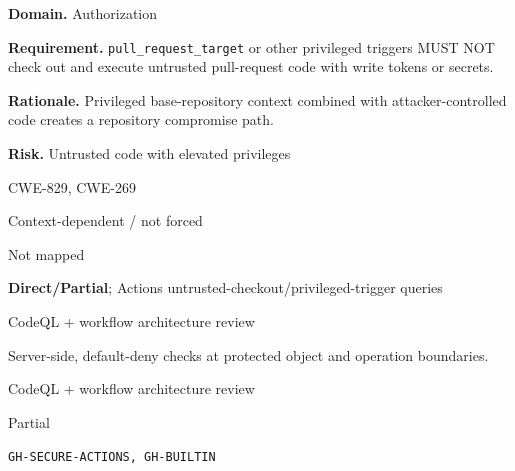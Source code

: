\documentclass[10pt,letterpaper]{article}
\newcommand{\code}[1]{\texttt{\small #1}}
\newcommand{\prioritybadge}[2]{\tcbox[on line,boxrule=0pt,arc=1.2mm,boxsep=0.7mm,left=1mm,right=1mm,top=0.4mm,bottom=0.4mm,colback=#2!12,coltext=#2]{\scriptsize\bfseries #1}}
\begin{document}
\begin{rulebox}[title={\texttt{SCS-ACTIONS-AUTHZ-002} \hfill \prioritybadge{Critical Control}{Critical}}]
\textbf{Domain.} Authorization

\textbf{Requirement.} \code{pull\_request\_target} or other privileged triggers MUST NOT check out and execute untrusted pull-request code with write tokens or secrets.

\textbf{Rationale.} Privileged base-repository context combined with attacker-controlled code creates a repository compromise path.

\textbf{Risk.} Untrusted code with elevated privileges

\begin{description}[leftmargin=2.65cm,labelwidth=2.3cm,style=nextline,itemsep=1pt,topsep=3pt]
  \item[CWE] CWE-829, CWE-269
  \item[OWASP] Context-dependent / not forced
  \item[CERT] Not mapped
  \item[CodeQL] \textbf{Direct/Partial}; Actions untrusted-checkout/privileged-trigger queries
  \item[Enforcement] CodeQL + workflow architecture review
  \item[Prevention] Server-side, default-deny checks at protected object and operation boundaries.
  \item[Verification] CodeQL + workflow architecture review
  \item[Automation] Partial
  \item[Sources] \texttt{GH-SECURE-ACTIONS, GH-BUILTIN}
\end{description}
\end{rulebox}
\end{document}

